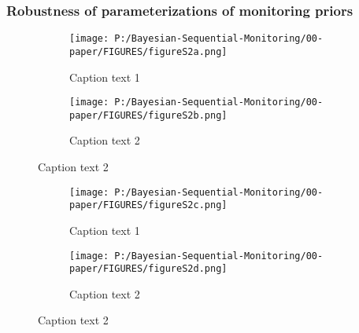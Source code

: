\documentclass[12pt]{article}
\begin{document}
\subsubsection{Robustness of parameterizations of monitoring priors}\label{sec:priorRobustness}
\begin{figure}
  \begin{subfigure}{7in}
    \centering\texttt{[image: P:/Bayesian-Sequential-Monitoring/00-paper/FIGURES/figureS2a.png]}
    \caption{Caption text 1}
  \end{subfigure}
  \begin{subfigure}{7in}
    \centering\texttt{[image: P:/Bayesian-Sequential-Monitoring/00-paper/FIGURES/figureS2b.png]}
    \caption{Caption text 2}
  \end{subfigure}
 \end{figure}
\begin{figure}
  \begin{subfigure}{7in}
    \centering\texttt{[image: P:/Bayesian-Sequential-Monitoring/00-paper/FIGURES/figureS2c.png]}
    \caption{Caption text 1}
  \end{subfigure}
  \begin{subfigure}{7in}
    \centering\texttt{[image: P:/Bayesian-Sequential-Monitoring/00-paper/FIGURES/figureS2d.png]}
    \caption{Caption text 2}
  \end{subfigure}
\end{figure}


 
 	
\end{document}
